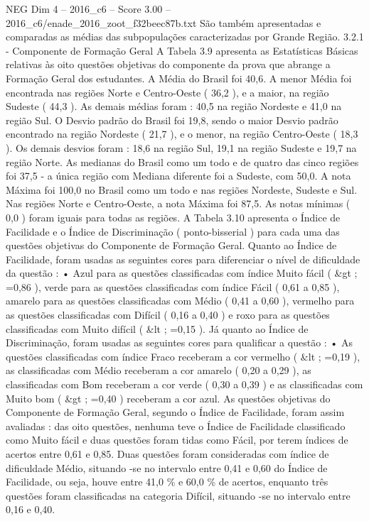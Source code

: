 \begin{textsample}{NEG Dim 4 – 2016\_c6 – Score 3.00 – 2016\_c6/enade\_2016\_zoot\_f32beec87b.txt}
São também apresentadas e comparadas as médias das subpopulações caracterizadas por Grande Região. 3.2.1 - Componente de Formação Geral A Tabela 3.9 apresenta as Estatísticas Básicas relativas às oito questões objetivas do componente da prova que abrange a Formação Geral dos estudantes.
A Média do Brasil foi 40,6.
A menor Média foi encontrada nas regiões Norte e Centro-Oeste ( 36,2 ), e a maior, na região Sudeste ( 44,3 ).
As demais médias foram : 40,5 na região Nordeste e 41,0 na região Sul.
O Desvio padrão do Brasil foi 19,8, sendo o maior Desvio padrão encontrado na região Nordeste ( 21,7 ), e o menor, na região Centro-Oeste ( 18,3 ).
Os demais desvios foram : 18,6 na região Sul, 19,1 na região Sudeste e 19,7 na região Norte.
As medianas do Brasil como um todo e de quatro das cinco regiões foi 37,5 - a única região com Mediana diferente foi a Sudeste, com 50,0.
A nota Máxima foi 100,0 no Brasil como um todo e nas regiões Nordeste, Sudeste e Sul.
Nas regiões Norte e Centro-Oeste, a nota Máxima foi 87,5.
As notas mínimas ( 0,0 ) foram iguais para todas as regiões.
A Tabela 3.10 apresenta o Índice de Facilidade e o Índice de Discriminação ( ponto-bisserial ) para cada uma das questões objetivas do Componente de Formação Geral.
Quanto ao Índice de Facilidade, foram usadas as seguintes cores para diferenciar o nível de dificuldade da questão : • Azul para as questões classificadas com índice Muito fácil ( \&gt ; =0,86 ), verde para as questões classificadas com índice Fácil ( 0,61 a 0,85 ), amarelo para as questões classificadas com Médio ( 0,41 a 0,60 ), vermelho para as questões classificadas com Difícil ( 0,16 a 0,40 ) e roxo para as questões classificadas com Muito difícil ( \&lt ; =0,15 ).
Já quanto ao Índice de Discriminação, foram usadas as seguintes cores para qualificar a questão : • As questões classificadas com índice Fraco receberam a cor vermelho ( \&lt ; =0,19 ), as classificadas com Médio receberam a cor amarelo ( 0,20 a 0,29 ), as classificadas com Bom receberam a cor verde ( 0,30 a 0,39 ) e as classificadas com Muito bom ( \&gt ; =0,40 ) receberam a cor azul.
As questões objetivas do Componente de Formação Geral, segundo o Índice de Facilidade, foram assim avaliadas : das oito questões, nenhuma teve o Índice de Facilidade classificado como Muito fácil e duas questões foram tidas como Fácil, por terem índices de acertos entre 0,61 e 0,85.
Duas questões foram consideradas com índice de dificuldade Médio, situando -se no intervalo entre 0,41 e 0,60 do Índice de Facilidade, ou seja, houve entre 41,0 \% e 60,0 \% de acertos, enquanto três questões foram classificadas na categoria Difícil, situando -se no intervalo entre 0,16 e 0,40.

\end{textsample}
